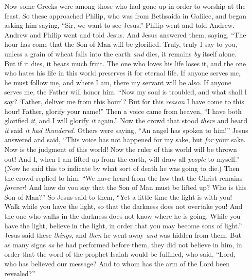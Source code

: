 \begin{biblechapter}
 Now some Greeks were among those who had gone up in order to worship at the feast.
\verse So these approached Philip, who was from Bethsaida in Galilee, and began asking him saying, “Sir, we want to see Jesus.”
\verse Philip went and told Andrew. Andrew and Philip went and told Jesus.
\verse And Jesus answered them, saying, “The hour has come that the Son of Man will be glorified.
\verse Truly, truly I say to you, unless a grain of wheat falls into the earth \textit{and} dies, it remains \textit{by} itself alone. But if it dies, it bears much fruit.
\verse The one who loves his life loses it, and the one who hates his life in this world preserves it for eternal life.
\verse If anyone serves me, he must follow me, and where I am, there my servant will be also. If anyone serves me, the Father will honor him.
 “Now my soul is troubled, and what shall I say? ‘Father, deliver me from this hour’? But for this \textit{reason} I have come to this hour!
\verse Father, glorify your name!” Then a voice came from heaven, “I have both glorified \textit{it}, and I will glorify \textit{it} again.”
\verse Now the crowd that stood \textit{there} and heard \textit{it} said \textit{it had thundered}. Others were saying, “An angel has spoken to him!”
\verse Jesus answered and said, “This voice has not happened for my sake, but \textit{for} your sake.
\verse Now is the judgment of this world! Now the ruler of this world will be thrown out!
\verse And I, when I am lifted up from the earth, will draw all \textit{people} to myself.”
\verse (Now he said this to indicate by what sort of death he was going to die.)
\verse Then the crowd replied to him, “We have heard from the law that the Christ remains \textit{forever}! And how do you say that the Son of Man must be lifted up? Who is this Son of Man?”
\verse So Jesus said to them, “Yet a little time the light is with you! Walk while you have the light, so that the darkness does not overtake you! And the one who walks in the darkness does not know where he is going.
\verse While you have the light, believe in the light, in order that you may become sons of light.” Jesus said these \textit{things}, and \textit{then} he went away \textit{and} was hidden from them.
 But as many signs \textit{as} he had performed before them, they did not believe in him,
\verse in order that the word of the prophet Isaiah would be fulfilled, who said, “Lord, who has believed our message? 
And to whom has the arm of the Lord been revealed?”

\end{biblechapter}
